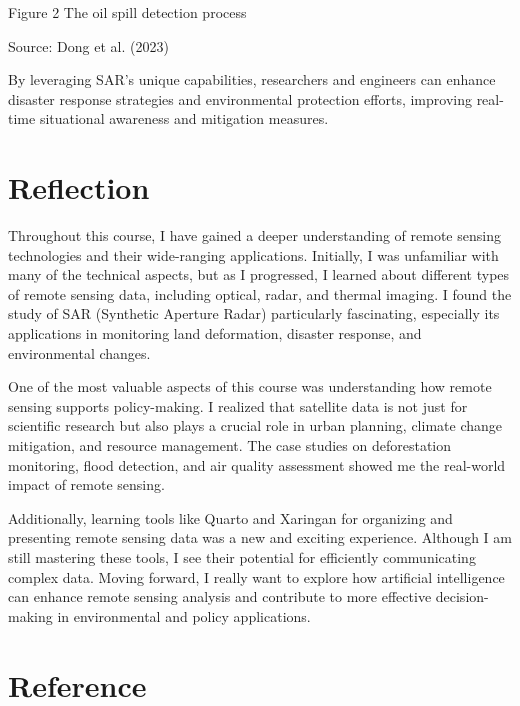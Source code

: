 \documentclass[
  letterpaper,
]{scrbook}
\begin{document}
Figure 2 The oil spill detection process

Source: Dong et al. (2023)

By leveraging SAR's unique capabilities, researchers and engineers can
enhance disaster response strategies and environmental protection
efforts, improving real-time situational awareness and mitigation
measures.

\section{Reflection}\label{reflection-6}

Throughout this course, I have gained a deeper understanding of remote
sensing technologies and their wide-ranging applications. Initially, I
was unfamiliar with many of the technical aspects, but as I progressed,
I learned about different types of remote sensing data, including
optical, radar, and thermal imaging. I found the study of SAR (Synthetic
Aperture Radar) particularly fascinating, especially its applications in
monitoring land deformation, disaster response, and environmental
changes.

One of the most valuable aspects of this course was understanding how
remote sensing supports policy-making. I realized that satellite data is
not just for scientific research but also plays a crucial role in urban
planning, climate change mitigation, and resource management. The case
studies on deforestation monitoring, flood detection, and air quality
assessment showed me the real-world impact of remote sensing.

Additionally, learning tools like Quarto and Xaringan for organizing and
presenting remote sensing data was a new and exciting experience.
Although I am still mastering these tools, I see their potential for
efficiently communicating complex data. Moving forward, I really want to
explore how artificial intelligence can enhance remote sensing analysis
and contribute to more effective decision-making in environmental and
policy applications.

\section*{Reference}\label{reference-6}
\end{document}
